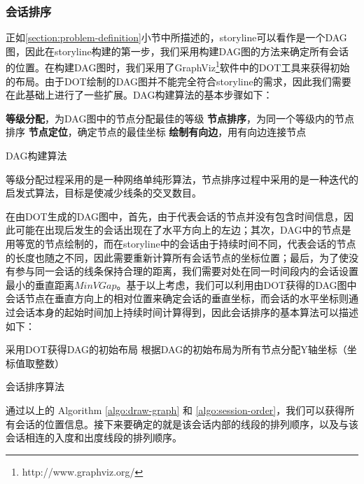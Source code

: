 \subsubsection{会话排序}
正如\ref{section:problem-definition}小节中所描述的，storyline可以看作是一个DAG图，因此在storyline构建的第一步，我们采用构建DAG图的方法来确定所有会话的位置。在构建DAG图时，我们采用了GraphViz\footnote{http://www.graphviz.org/}软件中的DOT工具\cite{Koutsofios1991, Gansner1993a}来获得初始的布局。由于DOT绘制的DAG图并不能完全符合storyline的需求，因此我们需要在此基础上进行了一些扩展。DAG构建算法\cite{Gansner1993a}的基本步骤如下：
\begin{algorithm}[H]
  \textbf{等级分配}，为DAG图中的节点分配最佳的等级 \;
  \textbf{节点排序}，为同一个等级内的节点排序 \;
  \textbf{节点定位}，确定节点的最佳坐标 \;
  \textbf{绘制有向边}，用有向边连接节点 \;
  \caption{DAG构建算法}
  \label{algo:draw-graph}
\end{algorithm}
等级分配过程采用的是一种网络单纯形算法，节点排序过程中采用的是一种迭代的启发式算法，目标是使减少线条的交叉数目。


在由DOT生成的DAG图中，首先，由于代表会话的节点并没有包含时间信息，因此可能在出现后发生的会话出现在了水平方向上的左边；其次，DAG中的节点是用等宽的节点绘制的，而在storyline中的会话由于持续时间不同，代表会话的节点的长度也随之不同，因此需要重新计算所有会话节点的坐标位置；最后，为了使没有参与同一会话的线条保持合理的距离，我们需要对处在同一时间段内的会话设置最小的垂直距离$MinVGap$。基于以上考虑，我们可以利用由DOT获得的DAG图中会话节点在垂直方向上的相对位置来确定会话的垂直坐标，而会话的水平坐标则通过会话本身的起始时间加上持续时间计算得到，因此会话排序的基本算法可以描述如下：
\begin{algorithm}[H]
  采用DOT获得DAG的初始布局 \;
  根据DAG的初始布局为所有节点分配Y轴坐标（坐标值取整数） \;
  \caption{会话排序算法}
  \label{algo:session-order}
\end{algorithm}
通过以上的 Algorithm \ref{algo:draw-graph} 和 \ref{algo:session-order}，我们可以获得所有会话的位置信息。接下来要确定的就是该会话内部的线段的排列顺序，以及与该会话相连的入度和出度线段的排列顺序。

